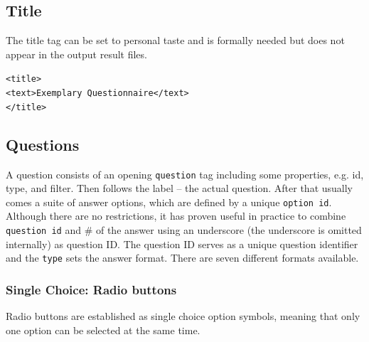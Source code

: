 \documentclass[11pt,a4paper,titlepage]{article}
\begin{document}
\subsection{Title}

The title tag can be set to personal taste and is formally needed but does not appear in the output result files.

\begin{center}
\begin{tcolorbox}[colback=black!10!white,colframe=black!50!white, boxsep=1pt,left=4pt,right=4pt,top=4pt,bottom=2pt]
\texttt{<title>\\
\hspace*{0.5cm}<text>Exemplary Questionnaire</text>\\
</title>}
\end{tcolorbox}
\end{center}


\subsection{Questions}

A question consists of an opening \texttt{question} tag including some properties, e.g. id, type, and filter. Then follows the label -- the actual question. After that usually comes a suite of answer options, which are defined by a unique \texttt{option id}. Although there are no restrictions, it has proven useful in practice to combine \texttt{question id} and \# of the answer using an underscore (the underscore is omitted internally) as question ID. The question ID serves as a unique question identifier and the \texttt{type} sets the answer format. There are seven different formats available.


\subsubsection{Single Choice: Radio buttons}

Radio buttons are established as single choice option symbols, meaning that only one option can be selected at the same time.
\end{document}
